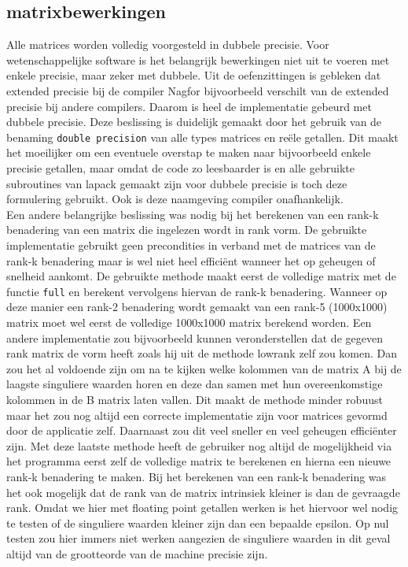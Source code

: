 \documentclass[a4paper]{article}
\begin{document}
\subsection*{matrixbewerkingen}
Alle matrices worden volledig voorgesteld in dubbele precisie. Voor wetenschappelijke software is het belangrijk bewerkingen niet uit te voeren met enkele precisie, maar zeker met dubbele. Uit de oefenzittingen is gebleken dat extended precisie bij de compiler Nagfor bijvoorbeeld verschilt van de extended precisie bij andere compilers. Daarom is heel de implementatie gebeurd met dubbele precisie. Deze beslissing is duidelijk gemaakt door het gebruik van de benaming \verb!double precision! van alle types matrices en re\"ele getallen. Dit maakt het moeilijker om een eventuele overstap te maken naar bijvoorbeeld enkele precisie getallen, maar omdat de code zo leesbaarder is en alle gebruikte subroutines van lapack gemaakt zijn voor dubbele precisie is toch deze formulering gebruikt. Ook is deze naamgeving compiler onafhankelijk.\\
Een andere belangrijke beslissing was nodig bij het berekenen van een rank-k benadering van een matrix die ingelezen wordt in rank vorm. De gebruikte implementatie gebruikt geen precondities in verband met de matrices van de rank-k benadering maar is wel niet heel effici\"ent wanneer het op geheugen of snelheid aankomt. De gebruikte methode maakt eerst de volledige matrix met de functie \verb!full! en berekent vervolgens hiervan de rank-k benadering. Wanneer op deze manier een rank-2 benadering wordt gemaakt van een rank-5 (1000x1000) matrix moet wel eerst de volledige 1000x1000 matrix berekend worden. Een andere implementatie zou bijvoorbeeld kunnen veronderstellen dat de gegeven rank matrix de vorm heeft zoals hij uit de methode lowrank zelf zou komen. Dan zou het al voldoende zijn om na te kijken welke kolommen van de matrix A bij de laagste singuliere waarden horen en deze dan samen met hun overeenkomstige kolommen in de B matrix laten vallen. Dit maakt de methode minder robuust maar het zou nog altijd een correcte implementatie zijn voor matrices gevormd door de applicatie zelf. Daarnaast zou dit veel sneller en veel geheugen effici\"enter zijn. Met deze laatste methode heeft de gebruiker nog altijd de mogelijkheid via het programma eerst zelf de volledige matrix te berekenen en hierna een nieuwe rank-k benadering te maken. Bij het berekenen van een rank-k benadering was het ook mogelijk dat de rank van de matrix intrinsiek kleiner is dan de gevraagde rank. Omdat we hier met floating point getallen werken is het hiervoor wel nodig te testen of de singuliere waarden kleiner zijn dan een bepaalde epsilon. Op nul testen zou hier immers niet werken aangezien de singuliere waarden in dit geval altijd van de grootteorde van de machine precisie zijn.
\end{document}
